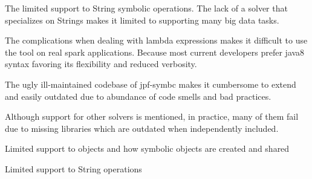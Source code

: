 

The limited support to String symbolic operations. The lack of a solver that specializes on Strings makes it limited to supporting many big data tasks.

The complications when dealing with lambda expressions makes it difficult to use the tool on real spark applications. Because most current developers prefer java8 syntax favoring its flexibility and reduced verbosity.

The ugly ill-maintained codebase of jpf-symbc makes it cumbersome to extend and easily outdated due to abundance of code smells and bad practices.

Although support for other solvers is mentioned, in practice, many of them fail due to missing libraries which are outdated when independently included.

Limited support to objects and how symbolic objects are created and shared

Limited support to String operations
